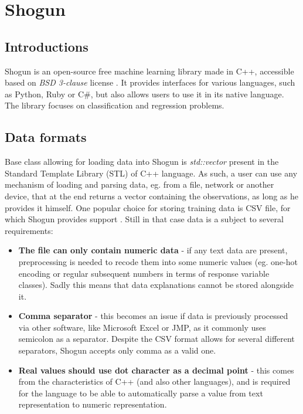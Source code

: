 \chapter{Shogun}

\section{Introductions}

Shogun is an open-source free machine learning library made in C++, accessible based on \textit{BSD 3-clause} license \cite{shogun:github}. It provides interfaces for various languages, such as Python, Ruby or C\#, but also allows users to use it in its native language. The library focuses on classification and regression problems.

\section{Data formats}

Base class allowing for loading data into Shogun is \textit{std::vector} present in the Standard Template Library (STL) of C++ language. As such, a user can use any mechanism of loading and parsing data, eg. from a file, network or another device, that at the end returns a vector containing the observations, as long as he provides it himself. One popular choice for storing training data is CSV file, for which Shogun provides support \cite{handsOnMachineLearning}. Still in that case data is a subject to several requirements:

\begin{itemize}
	\item \textbf{The file can only contain numeric data} - if any text data are present, preprocessing is needed to recode them into some numeric values (eg. one-hot encoding or regular subsequent numbers in terms of response variable classes). Sadly this means that data explanations cannot be stored alongside it.
	
	\item \textbf{Comma separator} - this becomes an issue if data is previously processed via other software, like Microsoft Excel or JMP, as it commonly uses semicolon as a separator. Despite the CSV format allows for several different separators, Shogun accepts only comma as a valid one.

	\item \textbf{Real values should use dot character as a decimal point} - this comes from the characteristics of C++ (and also other languages), and is required for the language to be able to automatically parse a value from text representation to numeric representation.
\end{itemize}

